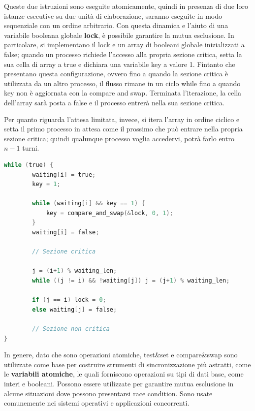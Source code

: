 \noindent Queste due istruzioni sono eseguite atomicamente, quindi in presenza di due loro istanze esecutive su due unità di elaborazione, saranno
eseguite in modo sequenziale con un ordine arbitrario. Con questa dinamica e l'aiuto di una variabile booleana globale \textbf{lock}, è possibile
garantire la mutua esclusione. In particolare, si implementano il lock e un array di booleani globale inizializzati a false; quando un processo richiede
l'accesso alla propria sezione critica, setta la sua cella di array a true e dichiara una variabile key a valore 1. Fintanto che presentano questa
configurazione, ovvero fino a quando la sezione critica è utilizzata da un altro processo, il flusso rimane in un ciclo while fino a quando key non è
aggiornata con la compare and swap. Terminata l'iterazione, la cella dell'array sarà posta a false e il processo entrerà nella sua sezione critica.\par
Per quanto riguarda l'attesa limitata, invece, si itera l'array in ordine ciclico e setta il primo processo in attesa come il prossimo che può entrare
nella propria sezione critica; quindi qualunque processo voglia accedervi, potrà farlo entro $n-1$ turni.

\begin{lstlisting}[language=C]
    while (true) {
        waiting[i] = true;
        key = 1;

        while (waiting[i] && key == 1) {
            key = compare_and_swap(&lock, 0, 1);
        }
        waiting[i] = false;

        // Sezione critica

        j = (i+1) % waiting_len;
        while ((j != i) && !waiting[j]) j = (j+1) % waiting_len;

        if (j == i) lock = 0;
        else waiting[j] = false;

        // Sezione non critica
}
\end{lstlisting}
\noindent In genere, dato che sono operazioni atomiche, test\&set e compare\&swap sono utilizzate come base per costruire strumenti di sincronizzazione
più astratti, come le \textbf{variabili atomiche}, le quali forniscono operazioni su tipi di dati base, come interi e booleani. Possono essere
utilizzate per garantire mutua esclusione in alcune situazioni dove possono presentarsi race condition. Sono usate comunemente nei sistemi operativi e
applicazioni concorrenti.

%

